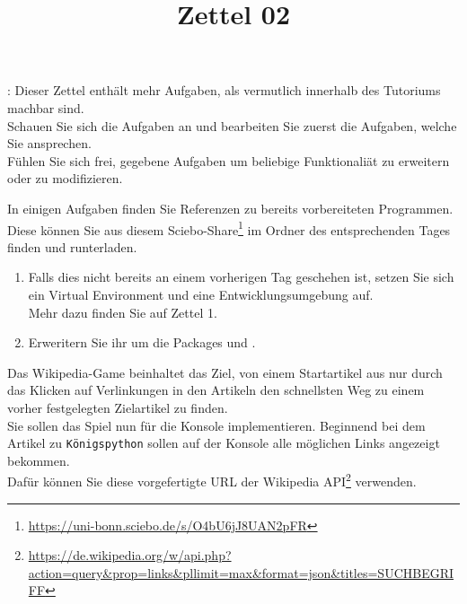 \documentclass{ubo_tex_uebungszettel/uebungszettel}
\title{Zettel 02}
\theoremstyle{definition}
\newcommand{\pp}[1]{\lpl{#1}}
\newcommand{\furl}[1]{\footnote{\url{#1}}}
\begin{document}
\maketitle

\noindent {}: \quad
Dieser Zettel enthält mehr Aufgaben, als vermutlich innerhalb des Tutoriums machbar sind.\\
Schauen Sie sich die Aufgaben an und bearbeiten Sie zuerst die Aufgaben, welche Sie ansprechen.\\
Fühlen Sie sich frei, gegebene Aufgaben um beliebige Funktionaliät zu erweitern oder zu modifizieren.

\medskip

\noindent In einigen Aufgaben finden Sie Referenzen zu bereits vorbereiteten Programmen. Diese können Sie aus diesem Sciebo-Share\furl{https://uni-bonn.sciebo.de/s/O4bU6jJ8UAN2pFR} im Ordner des entsprechenden Tages finden und runterladen.

\medskip


\noindent {} \quad

    \begin{enumerate}
        \item Falls dies nicht bereits an einem vorherigen Tag geschehen ist, setzen Sie sich ein Virtual Environment und eine Entwicklungsumgebung auf.\\
        Mehr dazu finden Sie auf Zettel 1.

        \item Erweritern Sie ihr \pp{venv} um die Packages \pp{fastapi} und \pp{requests}.
    \end{enumerate}

\medskip
\medskip

\medskip
\noindent {} \quad
  
    \noindent
    Das Wikipedia-Game beinhaltet das Ziel, von einem Startartikel aus nur durch das Klicken auf Verlinkungen in den Artikeln den schnellsten Weg zu einem vorher festgelegten Zielartikel zu finden. \\
    \noindent Sie sollen das Spiel nun für die Konsole implementieren.
    Beginnend bei dem Artikel zu \texttt{Königspython} sollen auf der Konsole alle möglichen Links angezeigt bekommen.\\

    \medskip 
    \noindent Dafür können Sie diese vorgefertigte URL der Wikipedia API\footnote{\url{https://de.wikipedia.org/w/api.php?action=query&prop=links&pllimit=max&format=json&titles=SUCHBEGRIFF}} verwenden.
\end{document}
